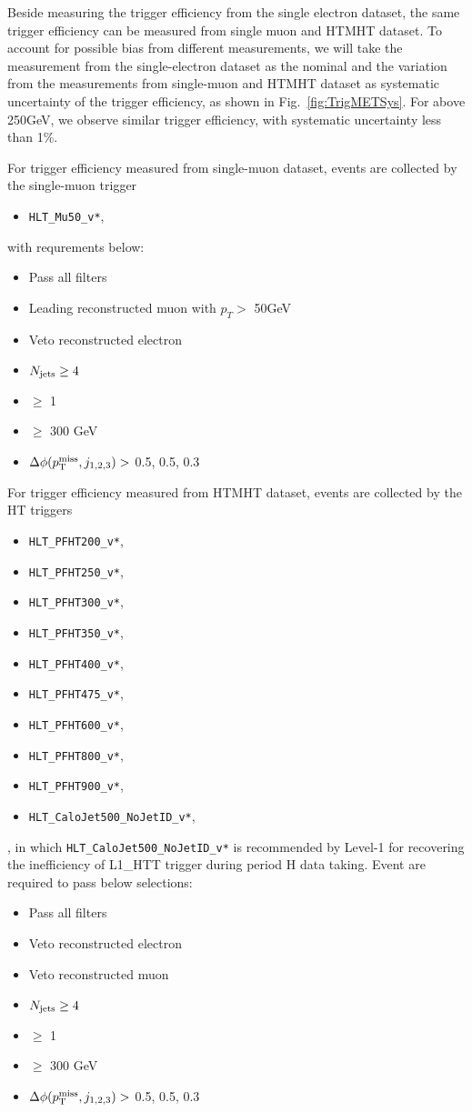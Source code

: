 Beside measuring the \MET trigger efficiency from the single electron dataset,
the same trigger efficiency can be measured from single muon and HTMHT
dataset. To account for possible bias from different measurements, we will
take the measurement from the single-electron dataset as the nominal and the
variation from the measurements from single-muon and HTMHT dataset as
systematic uncertainty of the trigger efficiency, as shown in
Fig.~\ref{fig:TrigMETSys}. For \MET above 250GeV, we observe similar \MET
trigger efficiency, with systematic uncertainty less than 1\%.

For \MET trigger efficiency measured from single-muon dataset, events are collected by the single-muon trigger
\begin{itemize}
  \item \texttt{HLT\_Mu50\_v*},
\end{itemize}
with requrements below:
\begin{itemize}
  \item Pass all filters
	\item Leading reconstructed muon with $p_{T}>$ 50GeV
  \item Veto reconstructed electron
  \item $N_{\text{jets}}\geq4$
  \item \nbjets $\ge$ 1
  \item \HT $\ge$ 300 GeV
  \item $\Delta\phi(p^{\rm miss}_{\rm T}, j_{1,2,3})>$ 0.5, 0.5, 0.3
\end{itemize}
For \MET trigger efficiency measured from HTMHT dataset, events are
collected by the HT triggers
\begin{itemize}
  \item \texttt{HLT\_PFHT200\_v*},
  \item \texttt{HLT\_PFHT250\_v*},
  \item \texttt{HLT\_PFHT300\_v*},
  \item \texttt{HLT\_PFHT350\_v*},
  \item \texttt{HLT\_PFHT400\_v*},
  \item \texttt{HLT\_PFHT475\_v*},
  \item \texttt{HLT\_PFHT600\_v*},
  \item \texttt{HLT\_PFHT800\_v*},
  \item \texttt{HLT\_PFHT900\_v*},
  \item \texttt{HLT\_CaloJet500\_NoJetID\_v*},
\end{itemize}, 
in which \texttt{HLT\_CaloJet500\_NoJetID\_v*} is recommended by Level-1 for
recovering the inefficiency of L1\_HTT trigger during period H data taking.
Event are required to pass below selections:
\begin{itemize}
  \item Pass all filters
  \item Veto reconstructed electron
  \item Veto reconstructed muon
  \item $N_{\text{jets}}\geq4$
  \item \nbjets $\ge$ 1
  \item \HT $\ge$ 300 GeV
  \item $\Delta\phi(p^{\rm miss}_{\rm T}, j_{1,2,3})>$ 0.5, 0.5, 0.3
\end{itemize}


